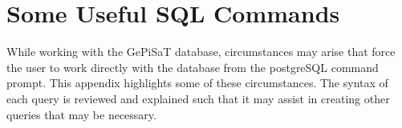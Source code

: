 %
%
%
%
%
\section{Some Useful SQL Commands}
\label{app:sql}
While working with the GePiSaT database, circumstances may arise that force the user to work directly with the database from the postgreSQL command prompt.  
This appendix highlights some of these circumstances.  
The syntax of each query is reviewed and explained such that it may assist in creating other queries that may be necessary.

